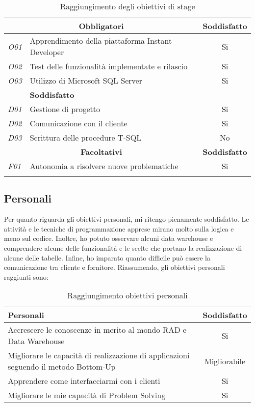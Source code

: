 	\begin{longtable}{ l|l|c }
		\hline
		
		\multicolumn{2}{c}{\textbf{Obbligatori}} & \textbf{Soddisfatto} \\
		\hline
		\textit{O01} & Apprendimento della piattaforma Instant Developer & Si\\
		\textit{O02} & Test delle funzionalità implementate e rilascio & Si\\
		\textit{O03} & Utilizzo di Microsoft SQL Server& Si\\
		\hline
		\newpage
		\hline
		\multicolumn{2}{c}{\textbf{Desiderabili}} & \textbf{Soddisfatto}\\
		\hline
		\textit{D01} & Gestione di progetto & Si\\
		\textit{D02} & Comunicazione con il cliente & Si\\
		\textit{D03} & Scrittura delle procedure T-SQL& No\\
		\hline
		\multicolumn{2}{c}{\textbf{Facoltativi}} & \textbf{Soddisfatto}\\
		\hline
		\textit{F01} & Autonomia a risolvere nuove problematiche & Si\\
\caption{Raggiungimento degli obiettivi di stage}
		
	\end{longtable}
	

\subsection{Personali}
Per quanto riguarda gli obiettivi personali, mi ritengo pienamente soddisfatto. Le attività e le tecniche di programmazione apprese mirano molto sulla logica e meno sul codice. Inoltre, ho potuto osservare alcuni data warehouse e comprendere alcune delle funzionalità e le scelte che portano la realizzazione di alcune delle tabelle. Infine, ho imparato quanto difficile può essere la comunicazione tra cliente e fornitore.
Riassumendo, gli obiettivi personali raggiunti sono:


\begin{table}[h]
	\begin{tabular}{p{10cm}|c}
		\hline
		\textbf{Personali}& \textbf{Soddisfatto} \\
		\hline
		Accrescere le conoscenze in merito al mondo RAD e Data Warehouse & Si\\
		Migliorare le capacità di realizzazione di applicazioni seguendo il metodo Bottom-Up & Migliorabile\\
		Apprendere come interfacciarmi con i clienti & Si\\
		Migliorare le mie capacità di Problem Solving & Si

	\end{tabular}
\caption{Raggiungimento obiettivi personali}
\end{table}


